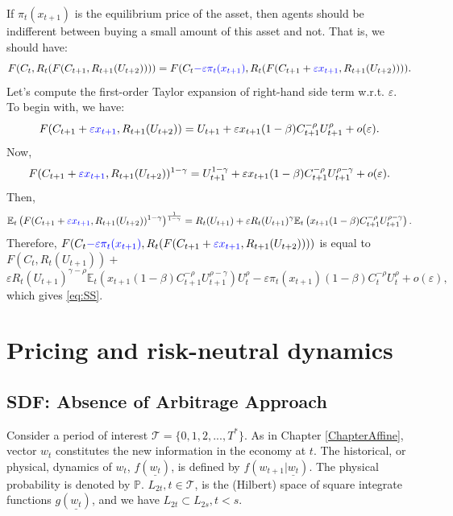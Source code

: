 \documentclass[
  12pt,
]{book}
\theoremstyle{definition}
\theoremstyle{definition}
\theoremstyle{definition}
\theoremstyle{definition}
\theoremstyle{remark}
\begin{document}
If \(\pi_t(x_{t+1})\) is the equilibrium price of the asset, then agents should be indifferent between buying a small amount of this asset and not. That is, we should have:
\[
F(C_t,R_t(F(C_{t+1},R_{t+1}(U_{t+2})))) =
F(C_t {\color{blue} - \varepsilon \pi_t(x_{t+1})},R_t(F(C_{t+1}+{\color{blue}\varepsilon x_{t+1}},R_{t+1}(U_{t+2})))).
\]
Let's compute the first-order Taylor expansion of right-hand side term w.r.t. \(\varepsilon\). To begin with, we have:
\[
F(C_{t+1}+{\color{blue}\varepsilon x_{t+1}},R_{t+1}(U_{t+2})) = U_{t+1} + \varepsilon x_{t+1} (1-\beta) C_{t+1}^{-\rho}U_{t+1}^\rho + o(\varepsilon).
\]
Now,
\[
F(C_{t+1}+{\color{blue}\varepsilon x_{t+1}},R_{t+1}(U_{t+2}))^{1-\gamma} = U_{t+1}^{1-\gamma} + \varepsilon x_{t+1}  (1-\beta) C_{t+1}^{-\rho}U_{t+1}^{\rho-\gamma} + o(\varepsilon).
\]
Then,
\[
\mathbb{E}_t \left( F(C_{t+1}+{\color{blue}\varepsilon x_{t+1}},R_{t+1}(U_{t+2}))^{1-\gamma} \right)^{\frac{1}{1-\gamma}}=R_t(U_{t+1}) + \varepsilon R_t(U_{t+1})^{\gamma} \mathbb{E}_t \left(  x_{t+1} (1-\beta) C_{t+1}^{-\rho} U_{t+1}^{\rho-\gamma} \right).
\]
Therefore, \(F(C_t{\color{blue} - \varepsilon \pi_t(x_{t+1})},R_t(F(C_{t+1}+{\color{blue}\varepsilon x_{t+1}},R_{t+1}(U_{t+2}))))\) is equal to \(F(C_t,R_t(U_{t+1}))+\)
\[
\varepsilon R_t(U_{t+1})^{\gamma - \rho} \mathbb{E}_t \left(  x_{t+1} (1-\beta) C_{t+1}^{-\rho} U_{t+1}^{\rho-\gamma} \right) U_t^{\rho}
- \varepsilon \pi_t(x_{t+1}) (1-\beta) C_t^{-\rho} U_t^{\rho} + o(\varepsilon),
\]
which gives \eqref{eq:SS}.

\hypertarget{pricing-and-risk-neutral-dynamics}{%
\chapter{Pricing and risk-neutral dynamics}\label{pricing-and-risk-neutral-dynamics}}

\hypertarget{PricingAAO}{%
\section{SDF: Absence of Arbitrage Approach}\label{PricingAAO}}

Consider a period of interest \({\mathcal T} = \{0,1,2,...,T^*\}\). As in Chapter \ref{ChapterAffine}, vector \(w_t\) constitutes the new information in the economy at \(t\). The historical, or physical, dynamics of \(w_t\), \(f(\underline{w_t})\), is defined by \(f(w_{t+1}|\underline{w_t})\). The physical probability is denoted by \(\mathbb{P}\). \(L_{2t}, t \in {\mathcal T}\), is the (Hilbert) space of square integrate functions \(g(\underline{w_t})\), and we have \(L_{2t} \subset L_{2s}, t< s\).
\end{document}
